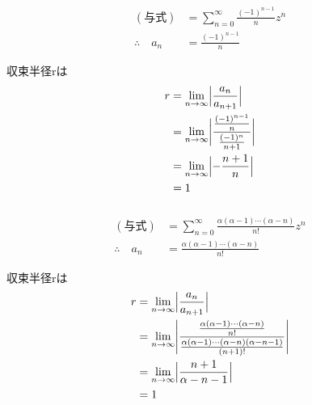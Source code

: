 \documentclass[dvipdfmx,a4paper]{jsarticle}
\begin{document}
\subsubsection{}
\begin{align*}
(与式) &= \sum_{n=0}^{\infty}\frac{(-1)^{n-1}}{n}z^n\\
\therefore\quad
a_n &= \frac{(-1)^{n-1}}{n}
\end{align*}

収束半径rは
\begin{align*}
r &= \lim_{n \to \infty}\Bigl|\frac{a_n}{a_{n+1}}\Bigr|\\
&= \lim_{n \to \infty}\biggl|\frac{\frac{(-1)^{n-1}}{n}}{\frac{(-1)^{n}}{n+1}}\biggr|\\
&= \lim_{n \to \infty}\Bigl|-\frac{n+1}{n}\Bigr|\\
&= 1
\end{align*}

\subsubsection{}
\begin{align*}
(与式) &= \sum_{n=0}^{\infty}\frac{\alpha(\alpha-1)\cdots(\alpha-n)}{n!}z^n\\
\therefore\quad
a_n &= \frac{\alpha(\alpha-1)\cdots(\alpha-n)}{n!}
\end{align*}

収束半径rは
\begin{align*}
r &= \lim_{n \to \infty}\Bigl|\frac{a_n}{a_{n+1}}\Bigr|\\
&= \lim_{n \to \infty}\Biggl|\frac{\frac{\alpha(\alpha-1)\cdots(\alpha-n)}{n!}}{\frac{\alpha(\alpha-1)\cdots(\alpha-n)(\alpha-n-1)}{(n+1)!}}\Biggr|\\
&= \lim_{n \to \infty}\Bigl|\frac{n+1}{\alpha-n-1}\Bigr|\\
&= 1
\end{align*}
\end{document}

